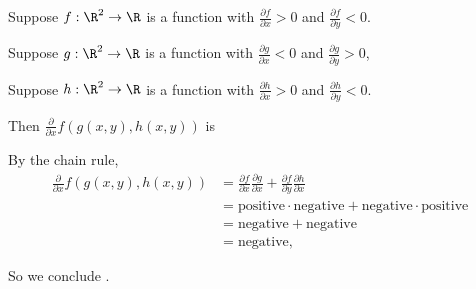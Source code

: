 \documentclass{ximera}
\author{Jim Fowler}
\begin{document}
\begin{exercise}
  

  Suppose $f : \R^2 \to \R$ is a function with  $\displaystyle\frac{\partial f}{\partial x} > 0$ and $\displaystyle\frac{\partial f}{\partial y} < 0$.

  Suppose $g : \R^2 \to \R$  is a function with      $\displaystyle\frac{\partial g}{\partial x} < 0$ and $\displaystyle\frac{\partial g}{\partial y} > 0$,

  
Suppose  $h : \R^2 \to \R$  is a function with      $\displaystyle\frac{\partial h}{\partial x} > 0$ and  $\displaystyle\frac{\partial h}{\partial y} < 0$.

Then $\displaystyle\frac{\partial}{\partial x} f(g(x,y),h(x,y))$ is
\begin{multipleChoice}
\end{multipleChoice}

\begin{hint}
 By the chain rule,
 \begin{align*}
 \frac{\partial}{\partial x} f(g(x,y),h(x,y))
 &= \frac{\partial f}{\partial x} \frac{\partial g}{\partial x} + \frac{\partial f}{\partial y} \frac{\partial h}{\partial x} \\
 &= \mbox{positive} \cdot \mbox{negative} + \mbox{negative} \cdot \mbox{positive} \\
 &= \mbox{negative} + \mbox{negative} \\
 &= \mbox{negative},
 \end{align*}
\end{hint}
\begin{hint}
 So we conclude .
\end{hint}

\end{exercise}
\end{document}
